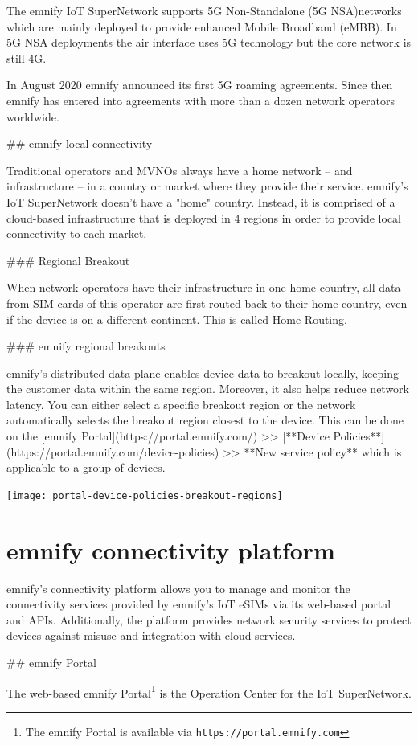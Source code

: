 \documentclass[11pt, oneside]{article}   	%
\newcommand{\addspace}{\vspace{2mm}}
\begin{document}
\begin{markdown}
  The emnify IoT SuperNetwork supports 5G Non-Standalone (5G NSA)networks which are mainly deployed to provide enhanced Mobile Broadband (eMBB).
  In 5G NSA deployments the air interface uses 5G technology but the core network is still 4G.
  
  In August 2020 emnify announced its first 5G roaming agreements.
  Since then emnify has entered into agreements with more than a dozen network operators worldwide.

## emnify local connectivity

Traditional operators and MVNOs always have a home network -- and infrastructure -- in a country or market where they provide their service. 
emnify's IoT SuperNetwork doesn't have a "home" country.
Instead, it is comprised of a cloud-based infrastructure that is deployed in 4 regions in order to provide local connectivity to each market. 

### Regional Breakout 

When network operators have their infrastructure in one home country, all data from SIM cards of this operator are first routed back to their home country, even if the device is on a different continent.
This is called Home Routing.


### emnify regional breakouts

emnify's distributed data plane enables device data to breakout locally, keeping the customer data within the same region.
Moreover, it also helps reduce network latency.
You can either select a specific breakout region or the network automatically selects the breakout region closest to the device.
This can be done on the [emnify Portal](https://portal.emnify.com/) >> [**Device Policies**](https://portal.emnify.com/device-policies) >> **New service policy** which is applicable to a group of devices.

\end{markdown}

\begin{center}
  \addspace
  \texttt{[image: portal-device-policies-breakout-regions]}
\end{center}

\pagebreak[4]

\section{emnify connectivity platform}

\begin{markdown}

emnify's connectivity platform allows you to manage and monitor the connectivity services provided by emnify's IoT eSIMs via its web-based portal and APIs.
Additionally, the platform provides network security services to protect devices against misuse and integration with cloud services.

## emnify Portal

\end{markdown}
The web-based \href{https://portal.emnify.com}{emnify Portal}\footnote{The emnify Portal is available via  \texttt{https://portal.emnify.com}} is the Operation Center for the IoT SuperNetwork.
\end{document}
